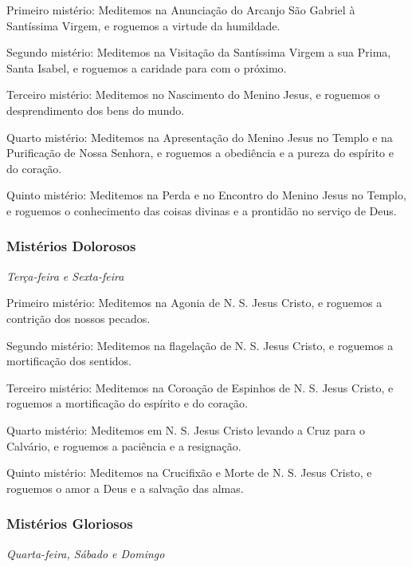 {\redx Primeiro mistério:} Meditemos na Anunciação do Arcanjo São Gabriel à Santíssima Virgem, e roguemos a virtude da humildade.\par
{\redx Segundo mistério:} Meditemos na Visitação da Santíssima Virgem a sua Prima, Santa Isabel, e roguemos a caridade para com o próximo.\par
{\redx Terceiro mistério:} Meditemos no Nascimento do Menino Jesus, e roguemos o desprendimento dos bens do mundo.\par
{\redx Quarto mistério:} Meditemos na Apresentação do Menino Jesus no Templo e na Purificação de Nossa Senhora, e roguemos a obediência e a pureza do espírito e do coração.\par
{\redx Quinto mistério:} Meditemos na Perda e no Encontro do Menino Jesus no Templo, e roguemos o conhecimento das coisas divinas e a prontidão no serviço de Deus.

\subsubsection{Mistérios Dolorosos}
\begin{nscenter}\emph{Terça-feira e Sexta-feira}\end{nscenter}

{\redx Primeiro mistério:} Meditemos na Agonia de N. S. Jesus Cristo, e roguemos a contrição dos nossos pecados.\par
{\redx Segundo mistério:} Meditemos na flagelação de N. S. Jesus Cristo, e roguemos a mortificação dos sentidos.\par
{\redx Terceiro mistério:} Meditemos na Coroação de Espinhos de N. S. Jesus Cristo, e roguemos a mortificação do espírito e do coração.\par
{\redx Quarto mistério:} Meditemos em N. S. Jesus Cristo levando a Cruz para o Calvário, e roguemos a paciência e a resignação.\par
{\redx Quinto mistério:} Meditemos na Crucifixão e Morte de N. S. Jesus Cristo, e roguemos o amor a Deus e a salvação das almas.

\subsubsection{Mistérios Gloriosos}
\begin{nscenter}\emph{Quarta-feira, Sábado e Domingo}\end{nscenter}

